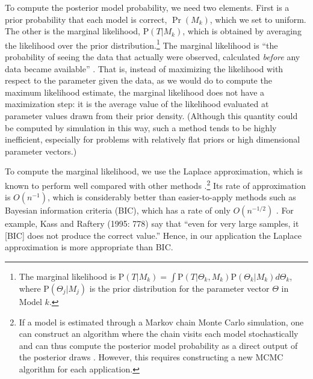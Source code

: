 \documentclass[11pt,titlepage]{article}
\renewcommand{\P}{\text{P}}
\begin{document}
To compute the posterior model probability, we need two elements.
First is a prior probability that each model is correct, $\Pr(M_k)$,
which we set to uniform.  The other is the marginal likelihood,
$\P(T|M_k)$, which is obtained by averaging the likelihood over the
prior distribution.\footnote{\label{eq:marglik}The marginal likelihood
  is $\P(T|M_k) = \int \P(T|\Theta_k, M_k) \P(\Theta_k|M_k)
  d\Theta_k$, where $\P(\Theta_j|M_j)$ is the prior distribution for
  the parameter vector $\Theta$ in Model $k$.}  The marginal
likelihood is ``the probability of seeing the data that actually were
observed, calculated \emph{before} any data became available''
\cite[p.776]{kass:raft:95}.  That is, instead of maximizing the
likelihood with respect to the parameter given the data, as we would
do to compute the maximum likelihood estimate, the marginal likelihood
does not have a maximization step: it is the average value of the
likelihood evaluated at parameter values drawn from their prior
density.  (Although this quantity could be computed by simulation in
this way, such a method tends to be highly inefficient, especially for
problems with relatively flat priors or high dimensional parameter
vectors.)

To compute the marginal likelihood, we use the Laplace approximation,
which is known to perform well compared with other methods
\citep{raft:96,lewi:raft:97,dici:kass:raft:wass:97}.\footnote{If a
  model is estimated through a Markov chain Monte Carlo simulation,
  one can construct an algorithm where the chain visits each model
  stochastically and can thus compute the posterior model probability
  as a direct output of the posterior draws \citep{chib:95}.  However,
  this requires constructing a new MCMC algorithm for each
  application.}  Its rate of approximation is $O(n^{-1})$, which is
considerably better than easier-to-apply methods such as Bayesian
information criteria (BIC), which has a rate of only $O(n^{-1/2})$
\citep{kass:tier:kada:89}.  For example, Kass and Raftery (1995: 778)
say that ``even for very large samples, it [BIC] does not produce the
correct value.''  Hence, in our application the Laplace approximation
is more appropriate than BIC.
\end{document}
